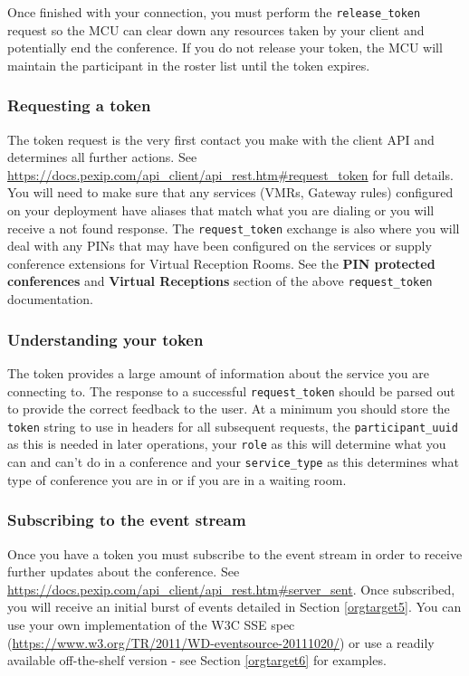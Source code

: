 \documentclass[a4paper,11pt]{article}
\begin{document}
Once finished with your connection, you must perform the
\texttt{release\_token} request so the MCU can clear down any resources taken
by your client and potentially end the conference.  If you do not
release your token, the MCU will maintain the participant in the
roster list until the token expires.

\subsubsection{Requesting a token}
\label{sec:orgheadline5}

\label{orgtarget4}

The token request is the very first contact you make with the client
API and determines all further actions.  See
\url{https://docs.pexip.com/api_client/api_rest.htm#request_token} for full
details.  You will need to make sure that any services (VMRs, Gateway rules)
configured on your deployment have aliases that match what you are
dialing or you will receive a not found response.  The
\texttt{request\_token} exchange is also where you will deal with any PINs
that may have been configured on the services or supply conference
extensions for Virtual Reception Rooms.  See the \textbf{PIN protected
conferences} and \textbf{Virtual Receptions} section of the above
\texttt{request\_token} documentation.

\subsubsection{Understanding your token}
\label{sec:orgheadline6}

The token provides a large amount of information about the service you
are connecting to.  The response to a successful \texttt{request\_token}
should be parsed out to provide the correct feedback to the user.  At
a minimum you should store the \texttt{token} string to use in headers for
all subsequent requests, the \texttt{participant\_uuid} as this is needed in later
operations, your \texttt{role} as this will determine what you can and can't
do in a conference and your \texttt{service\_type} as this determines what
type of conference you are in or if you are in a waiting room.

\subsubsection{Subscribing to the event stream}
\label{sec:orgheadline7}

Once you have a token you must subscribe to the event stream in order
to receive further updates about the conference.  See
\url{https://docs.pexip.com/api_client/api_rest.htm#server_sent}.  Once
subscribed, you will receive an initial burst of events detailed in
Section \ref{orgtarget5}.  You can use your own implementation of the
W3C SSE spec (\url{https://www.w3.org/TR/2011/WD-eventsource-20111020/}) or
use a readily available off-the-shelf version - see Section
\ref{orgtarget6} for examples.
\end{document}
